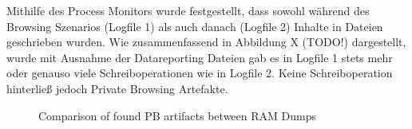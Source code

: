 Mithilfe des Process Monitors wurde festgestellt, dass sowohl während des Browsing Szenarios (Logfile 1) als auch danach (Logfile 2) Inhalte in Dateien geschrieben wurden. Wie zusammenfassend in Abbildung X (TODO!) dargestellt, wurde mit Ausnahme der Datareporting Dateien gab es in Logfile 1 stets mehr oder genauso viele Schreiboperationen wie in Logfile 2.
Keine Schreiboperation hinterließ jedoch Private Browsing Artefakte.
\begin{figure}[h!]
	\centerline{}
	\label{chart:final-criteria}  
	\caption{Comparison of found PB artifacts between RAM Dumps}
\end{figure}



